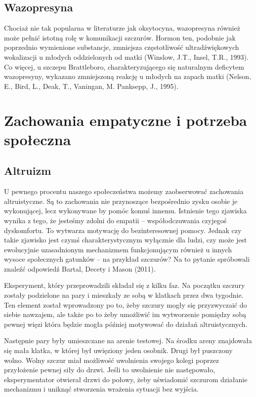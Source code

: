 \documentclass[12pt]{article}
\begin{document}
\subsection{Wazopresyna}

Chociaż nie tak popularna w literaturze jak oksytocyna, wazopresyna również może pełnić istotną rolę w komunikacji szczurów. Hormon ten, podobnie jak poprzednio wymienione substancje, zmniejsza częstotliwość ultradźwiękowych wokalizacji u młodych oddzielonych od matki (Winslow, J.T., Insel, T.R., 1993). Co więcej, u szczepu Brattleboro, charakteryzującego się naturalnym deficytem wazopresyny, wykazano zmniejszoną reakcję u młodych na zapach matki (Nelson, E., Bird, L., Deak, T., Vaningan, M. Panksepp, J., 1995).

\section{Zachowania empatyczne i potrzeba społeczna}

\subsection{Altruizm}

U pewnego procentu naszego społeczeństwa możemy zaobserwować zachowania altruistyczne. Są to zachowania nie przynoszące bezpośrednio zysku osobie je wykonującej, lecz wykonywane by pomóc komuś innemu. Istnienie tego zjawiska wynika z tego, że jesteśmy zdolni do empatii -- współodczuwania czyjegoś dyskomfortu. To wytwarza motywację do bezinteresownej pomocy. Jednak czy takie zjawisko jest czymś charakterystycznym wyłącznie dla ludzi, czy może jest ewolucyjnie uzasadnionym mechanizmem funkcjonującym również u innych wysoce społecznych gatunków -- na przykład szczurów? Na to pytanie spróbowali znaleźć odpowiedź Bartal, Decety i Mason (2011).

Eksperyment, który przeprowadzili składał się z kilku faz. Na początku szczury zostały podzielone na pary i mieszkały ze sobą w klatkach przez dwa tygodnie. Ten element został wprowadzony po to, żeby szczury mogły się przyzwyczaić do siebie nawzajem, ale także po to żeby umożliwić im wytworzenie pomiędzy sobą pewnej więzi która będzie mogła później motywować do działań altruistycznych.

Następnie pary były umieszczane na arenie testowej. Na środku areny znajdowała się mała klatka, w której był uwięziony jeden osobnik. Drugi był puszczony wolno. Wolny szczur miał możliwość uwolnienia swojego kolegi poprzez przyłożenie pewnej siły do drzwi. Jeśli to uwolnienie nie następowało, eksperymentator otwierał drzwi do połowy, żeby uświadomić szczurom działanie mechanizmu i uniknąć stworzenia wrażenia sytuacji bez wyjścia.
\end{document}
